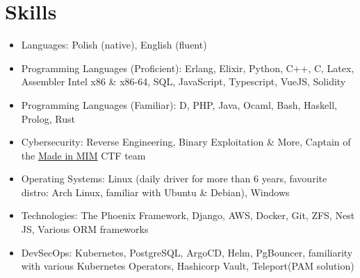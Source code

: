 \section{\sc Skills}
\begin{itemize}[leftmargin=0.16cm]
\setlength\itemsep{0em}
\item Languages: Polish (native), English (fluent)
\item Programming Languages (Proficient): Erlang, Elixir, Python, C++, C, Latex, Assembler Intel x86 \& x86-64, SQL, JavaScript, Typescript, VueJS, Solidity
\item Programming Languages (Familiar): D, PHP, Java, Ocaml, Bash, Haskell, Prolog, Rust
\item Cybersecurity: Reverse Engineering, Binary Exploitation \& More, Captain of the \href{https://ctftime.org/team/48557}{Made in MIM} CTF team
\item Operating Systems: Linux (daily driver for more than 6 years, favourite distro: Arch Linux, familiar with Ubuntu \& Debian), Windows
\item Technologies: The Phoenix Framework, Django, AWS, Docker, Git, ZFS, Nest JS, Various ORM frameworks
\item DevSecOps: Kubernetes, PostgreSQL, ArgoCD, Helm, PgBouncer, familiarity with various Kubernetes Operators, Hashicorp Vault, Teleport(PAM solution)
\end{itemize}
